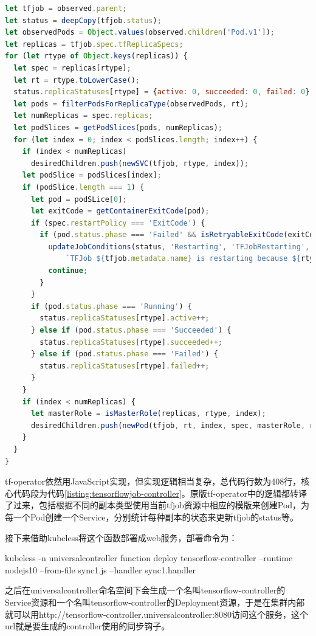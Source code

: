 \documentclass[macfonts,master]{njuthesis}
\begin{document}
\newpage
\begin{lstlisting}[language=JavaScript,caption=tensorflowjob-controller的部分实现代码,label=listing:tensorflowjob-controller]
let tfjob = observed.parent;
let status = deepCopy(tfjob.status);
let observedPods = Object.values(observed.children['Pod.v1']);
let replicas = tfjob.spec.tfReplicaSpecs;
for (let rtype of Object.keys(replicas)) {
  let spec = replicas[rtype];
  let rt = rtype.toLowerCase();
  status.replicaStatuses[rtype] = {active: 0, succeeded: 0, failed: 0};
  let pods = filterPodsForReplicaType(observedPods, rt);
  let numReplicas = spec.replicas;
  let podSlices = getPodSlices(pods, numReplicas);
  for (let index = 0; index < podSlices.length; index++) {
    if (index < numReplicas)
      desiredChildren.push(newSVC(tfjob, rtype, index));
    let podSlice = podSlices[index];
    if (podSlice.length === 1) {
      let pod = podSLice[0];
      let exitCode = getContainerExitCode(pod);
      if (spec.restartPolicy === 'ExitCode') {
        if (pod.status.phase === 'Failed' && isRetryableExitCode(exitCode)) {
          updateJobConditions(status, 'Restarting', 'TFJobRestarting',
              `TFJob ${tfjob.metadata.name} is restarting because ${rtype} replica(s) failed.`);
          continue;
        }
      }
      if (pod.status.phase === 'Running') {
        status.replicaStatuses[rtype].active++;
      } else if (pod.status.phase === 'Succeeded') {
        status.replicaStatuses[rtype].succeeded++;
      } else if (pod.status.phase === 'Failed') {
        status.replicaStatuses[rtype].failed++;
      }
    }
    if (index < numReplicas) {
      let masterRole = isMasterRole(replicas, rtype, index);
      desiredChildren.push(newPod(tfjob, rt, index, spec, masterRole, replicas));
    }
  }
}
\end{lstlisting}

tf-operator依然用JavaScript实现，但实现逻辑相当复杂，总代码行数为408行，核心代码段为代码\ref{listing:tensorflowjob-controller}。原版tf-operator中的逻辑都转译了过来，包括根据不同的副本类型使用当前tfjob资源中相应的模版来创建Pod，为每一个Pod创建一个Service，分别统计每种副本的状态来更新tfjob的status等。

接下来借助kubeless将这个函数部署成web服务，部署命令为：

kubeless -n universalcontroller function deploy tensorflow-controller --runtime nodejs10 --from-file sync1.js --handler sync1.handler

之后在universalcontroller命名空间下会生成一个名叫tensorflow-controller的Service资源和一个名叫tensorflow-controller的Deployment资源，于是在集群内部就可以用http://tensorflow-controller.universalcontroller:8080访问这个服务，这个url就是要生成的controller使用的同步钩子。
\end{document}
